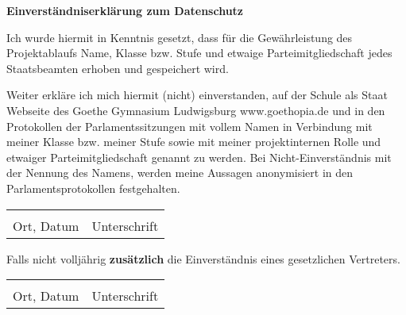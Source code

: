 \documentclass[14pt]{article}
\begin{document}
\textbf{\LARGE{Einverständniserklärung zum Datenschutz}}

\vspace{0.5cm}

Ich wurde hiermit in Kenntnis gesetzt, dass für die Gewährleistung des Projektablaufs
Name, Klasse bzw. Stufe und etwaige Parteimitgliedschaft jedes Staatsbeamten erhoben und
gespeichert wird.

Weiter erkläre ich mich hiermit (nicht) einverstanden, auf der Schule als Staat Webseite
des Goethe Gymnasium
Ludwigsburg www.goethopia.de und
in den Protokollen der Parlamentssitzungen mit vollem Namen in
Verbindung mit meiner Klasse bzw. meiner Stufe sowie mit meiner projektinternen Rolle und etwaiger
Parteimitgliedschaft genannt zu werden.
Bei Nicht-Einverständnis mit der Nennung des Namens, werden meine Aussagen anonymisiert in den
Parlamentsprotokollen festgehalten.

\vspace{10mm}
\begin{tabular}{p{9cm}p{9cm}}
    \dotfill & \dotfill \\
    Ort, Datum & Unterschrift \\
\end{tabular}

\vspace{10mm}
Falls nicht volljährig \textbf{zusätzlich} die Einverständnis eines gesetzlichen Vertreters.
\vspace{5mm}

\begin{tabular}{p{9cm}p{9cm}}
    \dotfill & \dotfill \\
    Ort, Datum & Unterschrift \\
\end{tabular}
\end{document}
